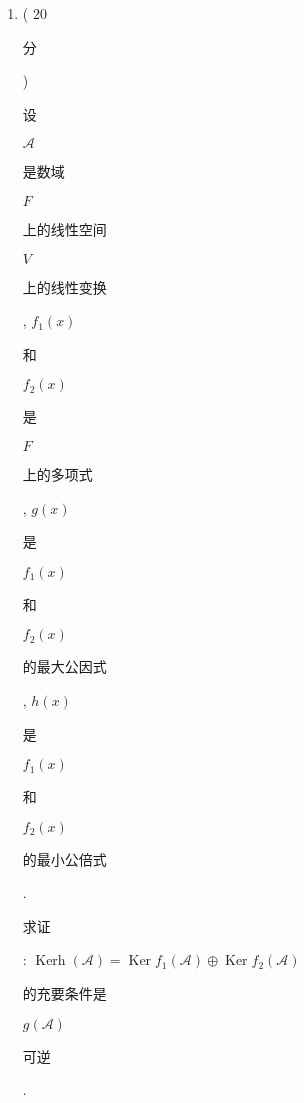 \documentclass[10pt]{article}
\begin{document}
\begin{enumerate}
  \item ( 20 \begin{CJK}{UTF8}{mj}分\end{CJK}) \begin{CJK}{UTF8}{mj}设\end{CJK} $\mathscr{A}$ \begin{CJK}{UTF8}{mj}是数域\end{CJK} $F$ \begin{CJK}{UTF8}{mj}上的线性空间\end{CJK} $V$ \begin{CJK}{UTF8}{mj}上的线性变换\end{CJK}, $f_{1}(x)$ \begin{CJK}{UTF8}{mj}和\end{CJK} $f_{2}(x)$ \begin{CJK}{UTF8}{mj}是\end{CJK} $F$ \begin{CJK}{UTF8}{mj}上的多项式\end{CJK}, $g(x)$ \begin{CJK}{UTF8}{mj}是\end{CJK} $f_{1}(x)$ \begin{CJK}{UTF8}{mj}和\end{CJK} $f_{2}(x)$ \begin{CJK}{UTF8}{mj}的最大公因式\end{CJK}, $h(x)$ \begin{CJK}{UTF8}{mj}是\end{CJK} $f_{1}(x)$ \begin{CJK}{UTF8}{mj}和\end{CJK} $f_{2}(x)$ \begin{CJK}{UTF8}{mj}的最小公倍式\end{CJK}. \begin{CJK}{UTF8}{mj}求证\end{CJK}: $\operatorname{Kerh}(\mathscr{A})=\operatorname{Ker} f_{1}(\mathscr{A}) \oplus \operatorname{Ker} f_{2}(\mathscr{A})$ \begin{CJK}{UTF8}{mj}的充要条件是\end{CJK} $g(\mathscr{A})$ \begin{CJK}{UTF8}{mj}可逆\end{CJK}.

\end{enumerate}
\end{document}
